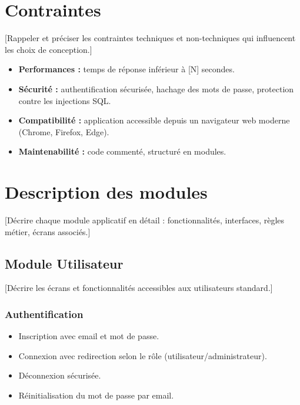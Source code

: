 \documentclass[12pt, a4paper]{article}
\begin{document}
\section{Contraintes}

[Rappeler et préciser les contraintes techniques et non-techniques qui
influencent les choix de conception.]

\begin{itemize}
  \item \textbf{Performances :} temps de réponse inférieur à [N] secondes.
  \item \textbf{Sécurité :} authentification sécurisée, hachage des mots de
    passe, protection contre les injections SQL.
  \item \textbf{Compatibilité :} application accessible depuis un navigateur
    web moderne (Chrome, Firefox, Edge).
  \item \textbf{Maintenabilité :} code commenté, structuré en modules.
\end{itemize}

\section{Description des modules}

[Décrire chaque module applicatif en détail : fonctionnalités, interfaces,
règles métier, écrans associés.]

\subsection{Module Utilisateur}

[Décrire les écrans et fonctionnalités accessibles aux utilisateurs standard.]

\subsubsection{Authentification}

\begin{itemize}
  \item Inscription avec email et mot de passe.
  \item Connexion avec redirection selon le rôle (utilisateur/administrateur).
  \item Déconnexion sécurisée.
  \item Réinitialisation du mot de passe par email.
\end{itemize}
\end{document}
